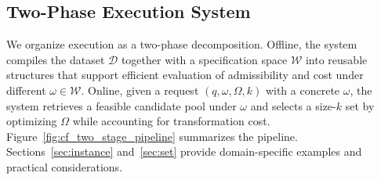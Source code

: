\subsection{Two-Phase Execution System}
We organize execution as a two-phase decomposition. Offline, the system compiles the dataset $\mathcal D$ together with a specification space $\mathcal W$ into reusable structures that support efficient evaluation of admissibility and cost under different $\omega \in \mathcal W$. Online, given a request $(q,\omega,\Omega,k)$ with a concrete $\omega$, the system retrieves a feasible candidate pool under $\omega$ and selects a size-$k$ set by optimizing $\Omega$ while accounting for transformation cost. Figure~\ref{fig:cf_two_stage_pipeline} summarizes the pipeline. Sections~\ref{sec:instance} and~\ref{sec:set} provide domain-specific examples and practical considerations.

